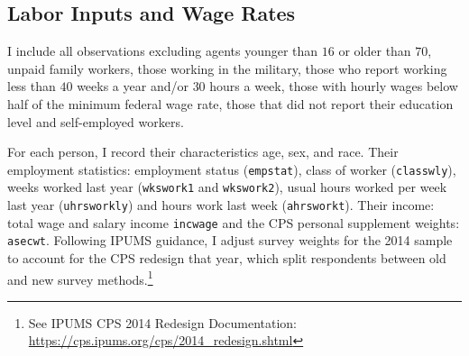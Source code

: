 \documentclass[12pt]{article}
\begin{document}


\subsection{Labor Inputs and Wage Rates}\label{subsec:labor-inputs-wage-rates}
I include all observations excluding agents younger than $16$ or older than $70$, unpaid family workers, those working in the military, those who report working less than $40$ weeks a year and/or $30$ hours a week, those with hourly wages below half of the minimum federal wage rate, those that did not report their education level and self-employed workers.

For each person, I record their characteristics age, sex, and race. Their employment statistics: employment status (\texttt{empstat}), class of worker (\texttt{classwly}), weeks worked last year (\texttt{wkswork1} and \texttt{wkswork2}), usual hours worked per week last year (\texttt{uhrsworkly}) and hours work last week (\texttt{ahrsworkt}). Their income: total wage and salary income \texttt{incwage} and the CPS personal supplement weights: \texttt{asecwt}. Following IPUMS guidance, I adjust survey weights for the 2014 sample to account for the CPS redesign that year, which split respondents between old and new survey methods.\footnote{See IPUMS CPS 2014 Redesign Documentation: \url{https://cps.ipums.org/cps/2014\_redesign.shtml}}
\end{document}
